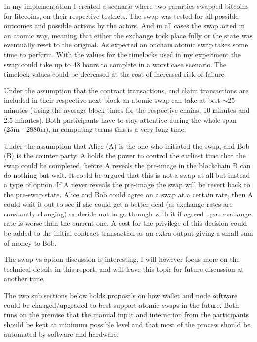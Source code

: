 In my implementation I created a scenario where two pararties swapped bitcoins for litecoins, on their respective testnets. 
The swap was tested for all possible outcomes and possible actions by the actors. And in all cases the swap acted in an atomic way, meaning that either the exchange tock place fully or the state was eventually reset to the original. 
As expected an onchain atomic swap takes some time to perform. With the values for the timelocks used in my experiment the swap could take up to 48 hours to complete in a worst case scenario. The timelock values could be decreased at the cost of increased risk of failure. 

Under the assumption that the contract transactions, and claim transactions are included in their respective next block an atomic swap can take at best $\sim25$ minutes (Using the average block times for the respective chains, 10 minutes and 2.5 minutes). Both participants have to stay attentive during the whole span (25m - 2880m), in computing terms this is a very long time. 

Under the assumption that Alice (A) is the one who initiated the swap, and Bob (B) is the counter party. A holds the power to control the earliest time that the swap could be completed, before A reveals the pre-image in the blockchain B can do nothing but wait. It could be argued that this is not a swap at all but instead a type of option. If A never reveals the pre-image the swap will be revert back to the pre-swap state. Alice and Bob could agree on a swap at a certain rate, then A could wait it out to see if she could get a better deal (as exchange rates are constantly changing) or decide not to go through with it if agreed upon exchange rate is worse than the current one. A cost for the privilege of this decision could be added to the initial contract transaction as an extra output giving a small sum of money to Bob. 

The swap vs option discussion is interesting, I will however focus more on the technical details in this report, and will leave this topic for future discussion at another time. 

The two sub sections below holds proposals on how wallet and node software could be changed/upgraded to best support atomic swaps in the future. Both runs on the premise that the manual input and interaction from the participants should be kept at minimum possible level and that most of the process should be automated by software and hardware.

